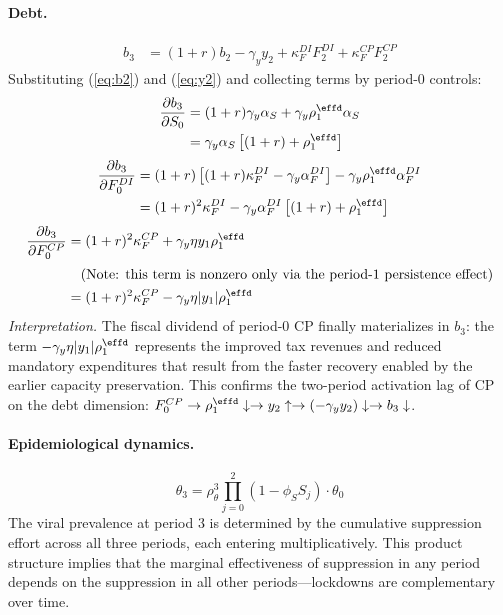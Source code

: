 \documentclass[12pt, a4paper]{article}
\begin{document}
\paragraph{Debt.}
%
\begin{align}
    b_3 &= (1+r) b_2 - \gamma_y y_2
      + \kappa_F^{DI} F_2^{DI} + \kappa_F^{CP} F_2^{CP}
    \label{eq:b3_recursive}
\end{align}
%
Substituting (\ref{eq:b2}) and (\ref{eq:y2}) and collecting terms by period-0 controls:
%
\begin{align}
    \frac{\partial b_3}{\partial S_0}
      &= (1+r) \gamma_y \alpha_S
        + \gamma_y \rho_1^{\effd} \alpha_S
    \notag \\
      &= \gamma_y \alpha_S \left[(1+r) + \rho_1^{\effd}\right]
    \label{eq:db3_dS0}
\end{align}
%
\begin{align}
    \frac{\partial b_3}{\partial F_0^{DI}}
      &= (1+r)\left[(1+r)\kappa_F^{DI} - \gamma_y \alpha_F^{DI}\right]
        - \gamma_y \rho_1^{\effd} \alpha_F^{DI}
    \notag \\
      &= (1+r)^2 \kappa_F^{DI}
        - \gamma_y \alpha_F^{DI} \left[(1+r) + \rho_1^{\effd}\right]
    \label{eq:db3_dDI0}
\end{align}
%
\begin{align}
    \frac{\partial b_3}{\partial F_0^{CP}}
      &= (1+r)^2 \kappa_F^{CP}
        + \gamma_y \eta y_1 \rho_1^{\effd}
    \notag \\[2pt]
      &\quad\text{(Note: this term is nonzero only via the period-1 persistence effect)}
    \notag \\
      &= (1+r)^2 \kappa_F^{CP}
        - \gamma_y \eta |y_1| \rho_1^{\effd}
    \label{eq:db3_dCP0}
\end{align}
%
\textit{Interpretation.} The fiscal dividend of period-0 CP finally materializes in $b_3$: the term $-\gamma_y \eta |y_1| \rho_1^{\effd}$ represents the improved tax revenues and reduced mandatory expenditures that result from the faster recovery enabled by the earlier capacity preservation. This confirms the two-period activation lag of CP on the debt dimension: $F_0^{CP} \to \rho_1^{\effd} \downarrow \to y_2 \uparrow \to (-\gamma_y y_2) \downarrow \to b_3 \downarrow$.

\paragraph{Epidemiological dynamics.}
%
\begin{equation}
    \theta_3 = \rho_\theta^3 \prod_{j=0}^{2} (1 - \phi_S S_j) \cdot \theta_0
    \label{eq:theta3}
\end{equation}
%
The viral prevalence at period 3 is determined by the cumulative suppression effort across all three periods, each entering multiplicatively. This product structure implies that the marginal effectiveness of suppression in any period depends on the suppression in all other periods---lockdowns are complementary over time.
\end{document}
